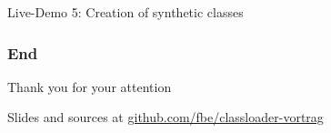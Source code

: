 \documentclass[aspectratio=169]{beamer}
\begin{document}
	\begin{frame}
		Live-Demo 5: Creation of synthetic classes
	\end{frame}

	
	\begin{frame}
		\frametitle{End}
		
		\begin{center}
			Thank you for your attention
			\par
			Slides and sources at \href{https://github.com/fbe/classloader-vortrag}{github.com/fbe/classloader-vortrag}
		\end{center}

	\end{frame}
\end{document}
